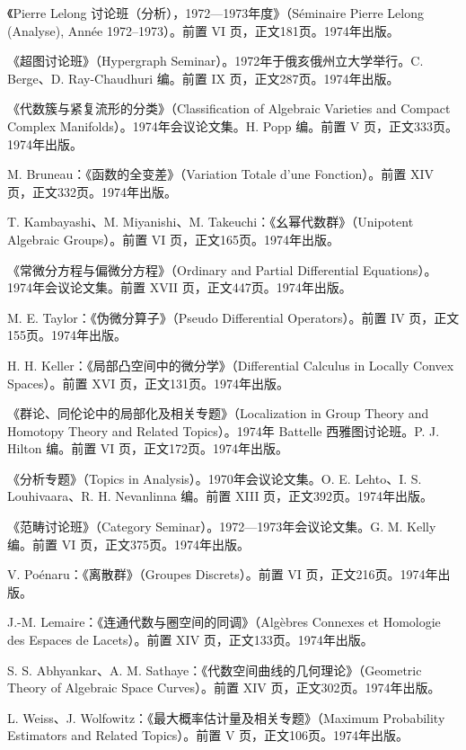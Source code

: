 \begin{description}[style=nextline,leftmargin=1.5em,itemsep=7pt]
\item[第410卷]《Pierre Lelong 讨论班（分析），1972—1973年度》（Séminaire Pierre Lelong (Analyse), Année 1972--1973）。前置 VI 页，正文181页。1974年出版。
\item[第411卷]《超图讨论班》（Hypergraph Seminar）。1972年于俄亥俄州立大学举行。C. Berge、D. Ray-Chaudhuri 编。前置 IX 页，正文287页。1974年出版。
\item[第412卷]《代数簇与紧复流形的分类》（Classification of Algebraic Varieties and Compact Complex Manifolds）。1974年会议论文集。H. Popp 编。前置 V 页，正文333页。1974年出版。
\item[第413卷] M. Bruneau：《函数的全变差》（Variation Totale d'une Fonction）。前置 XIV 页，正文332页。1974年出版。
\item[第414卷] T. Kambayashi、M. Miyanishi、M. Takeuchi：《幺幂代数群》（Unipotent Algebraic Groups）。前置 VI 页，正文165页。1974年出版。
\item[第415卷]《常微分方程与偏微分方程》（Ordinary and Partial Differential Equations）。1974年会议论文集。前置 XVII 页，正文447页。1974年出版。
\item[第416卷] M. E. Taylor：《伪微分算子》（Pseudo Differential Operators）。前置 IV 页，正文155页。1974年出版。
\item[第417卷] H. H. Keller：《局部凸空间中的微分学》（Differential Calculus in Locally Convex Spaces）。前置 XVI 页，正文131页。1974年出版。
\item[第418卷]《群论、同伦论中的局部化及相关专题》（Localization in Group Theory and Homotopy Theory and Related Topics）。1974年 Battelle 西雅图讨论班。P. J. Hilton 编。前置 VI 页，正文172页。1974年出版。
\item[第419卷]《分析专题》（Topics in Analysis）。1970年会议论文集。O. E. Lehto、I. S. Louhivaara、R. H. Nevanlinna 编。前置 XIII 页，正文392页。1974年出版。
\item[第420卷]《范畴讨论班》（Category Seminar）。1972—1973年会议论文集。G. M. Kelly 编。前置 VI 页，正文375页。1974年出版。
\item[第421卷] V. Poénaru：《离散群》（Groupes Discrets）。前置 VI 页，正文216页。1974年出版。
\item[第422卷] J.-M. Lemaire：《连通代数与圈空间的同调》（Algèbres Connexes et Homologie des Espaces de Lacets）。前置 XIV 页，正文133页。1974年出版。
\item[第423卷] S. S. Abhyankar、A. M. Sathaye：《代数空间曲线的几何理论》（Geometric Theory of Algebraic Space Curves）。前置 XIV 页，正文302页。1974年出版。
\item[第424卷] L. Weiss、J. Wolfowitz：《最大概率估计量及相关专题》（Maximum Probability Estimators and Related Topics）。前置 V 页，正文106页。1974年出版。

\end{description}
